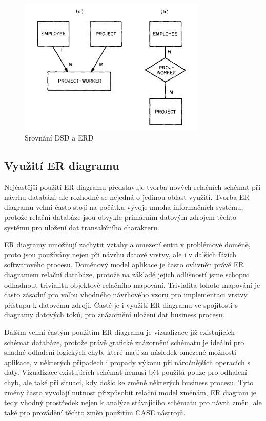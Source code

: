 \documentclass[czech,bachelor,public,dept460,male,oneside]{diploma}
\begin{document}
	\begin{figure}[!h]
		\centering
		\includegraphics[width=0.80\textwidth]{Figures/ChenVsDSD}
		\subfloat[ER diagram]{\hspace{.25\linewidth}}
		\caption[Srovnání DSD a ERD]{Srovnání DSD a ERD \cite{chenERD}}
	\end{figure}
	
	\subsection{Využití ER diagramu}
	Nejčastější použití ER diagramu představuje tvorba nových relačních schémat při návrhu databází, ale rozhodně se nejedná o jedinou oblast využití. Tvorba ER diagramu velmi často stojí na počátku vývoje mnoha informačních systému, protože relační databáze jsou obvykle primárním datovým zdrojem těchto systému pro uložení dat transakčního charakteru. 
	
	ER diagramy umožňují zachytit vztahy a omezení entit v problémové doméně, proto jsou používány nejen při návrhu datové vrstvy, ale i v dalších fázích softwarového procesu. Doménový model aplikace je často ovlivněn právě ER diagramem relační databáze, protože na základě jejich odlišností jsme schopni odhadnout trivialitu objektově-relačního mapování. Trivialita tohoto mapování je často zásadní pro volbu vhodného návrhového vzoru pro implementaci vrstvy přístupu k datovému zdroji. Časté je i využití ER diagramu ve spojitosti s diagramy datových toků, pro znázornění uložení dat business procesu.
	
	Dalším velmi častým použitím ER diagramu je vizualizace již existujících schémat databáze, protože právě grafické znázornění schématu je ideální pro snadné odhalení logických chyb, které mají za následek omezené možnosti aplikace, v některých případech i propady výkonu při náročnějších operacích s daty. 
	Vizualizace existujících schémat nemusí být použitá pouze pro odhalení chyb, ale také při situaci, kdy došlo ke změně některých business procesu. Tyto změny často vyvolají nutnost přizpůsobit relační model změnám, ER diagram je tedy vhodný prostředek nejen k analýze stávajícího schématu pro návrh změn, ale také pro provádění těchto změn použitím CASE nástrojů.
	
\end{document}
